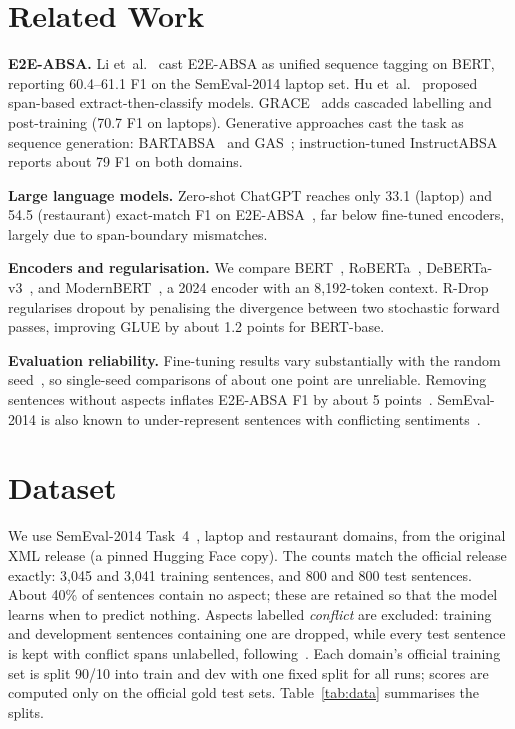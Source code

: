 \documentclass[conference]{IEEEtran}
\begin{document}
\section{Related Work}
\textbf{E2E-ABSA.} Li et~al.~\cite{li2019bert} cast E2E-ABSA as unified sequence tagging on BERT, reporting 60.4--61.1 F1 on the SemEval-2014 laptop set. Hu et~al.~\cite{hu2019span} proposed span-based extract-then-classify models. GRACE~\cite{luo2020grace} adds cascaded labelling and post-training (70.7 F1 on laptops). Generative approaches cast the task as sequence generation: BARTABSA~\cite{yan2021unified} and GAS~\cite{zhang2021gas}; instruction-tuned InstructABSA~\cite{scaria2023instructabsa} reports about 79 F1 on both domains.

\textbf{Large language models.} Zero-shot ChatGPT reaches only 33.1 (laptop) and 54.5 (restaurant) exact-match F1 on E2E-ABSA~\cite{zhang2023llm}, far below fine-tuned encoders, largely due to span-boundary mismatches.

\textbf{Encoders and regularisation.} We compare BERT~\cite{devlin2019bert}, RoBERTa~\cite{liu2019roberta}, DeBERTa-v3~\cite{he2023debertav3}, and ModernBERT~\cite{warner2024modernbert}, a 2024 encoder with an 8,192-token context. R-Drop~\cite{liang2021rdrop} regularises dropout by penalising the divergence between two stochastic forward passes, improving GLUE by about 1.2 points for BERT-base.

\textbf{Evaluation reliability.} Fine-tuning results vary substantially with the random seed~\cite{reimers2017reporting,dodge2020finetuning}, so single-seed comparisons of about one point are unreliable. Removing sentences without aspects inflates E2E-ABSA F1 by about 5 points~\cite{gong2020unified}. SemEval-2014 is also known to under-represent sentences with conflicting sentiments~\cite{jiang2019mams,xing2020arts}.

\section{Dataset}
We use SemEval-2014 Task~4~\cite{pontiki2014semeval}, laptop and restaurant domains, from the original XML release (a pinned Hugging Face copy). The counts match the official release exactly: 3,045 and 3,041 training sentences, and 800 and 800 test sentences. About 40\% of sentences contain no aspect; these are retained so that the model learns when to predict nothing. Aspects labelled \emph{conflict} are excluded: training and development sentences containing one are dropped, while every test sentence is kept with conflict spans unlabelled, following~\cite{li2019bert}. Each domain's official training set is split 90/10 into train and dev with one fixed split for all runs; scores are computed only on the official gold test sets. Table~\ref{tab:data} summarises the splits.
\end{document}
